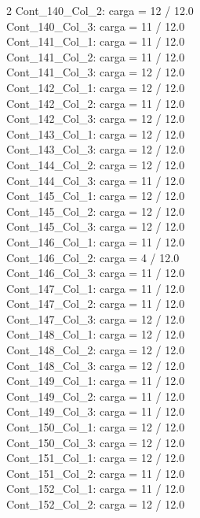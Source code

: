 \begin{multicols}{2}
Cont\_140\_Col\_2: carga = 12 / 12.0\\
Cont\_140\_Col\_3: carga = 11 / 12.0\\
Cont\_141\_Col\_1: carga = 11 / 12.0\\
Cont\_141\_Col\_2: carga = 11 / 12.0\\
Cont\_141\_Col\_3: carga = 12 / 12.0\\
Cont\_142\_Col\_1: carga = 12 / 12.0\\
Cont\_142\_Col\_2: carga = 11 / 12.0\\
Cont\_142\_Col\_3: carga = 12 / 12.0\\
Cont\_143\_Col\_1: carga = 12 / 12.0\\
Cont\_143\_Col\_3: carga = 12 / 12.0\\
Cont\_144\_Col\_2: carga = 12 / 12.0\\
Cont\_144\_Col\_3: carga = 11 / 12.0\\
Cont\_145\_Col\_1: carga = 12 / 12.0\\
Cont\_145\_Col\_2: carga = 12 / 12.0\\
Cont\_145\_Col\_3: carga = 12 / 12.0\\
Cont\_146\_Col\_1: carga = 11 / 12.0\\
Cont\_146\_Col\_2: carga = 4 / 12.0\\
Cont\_146\_Col\_3: carga = 11 / 12.0\\
Cont\_147\_Col\_1: carga = 11 / 12.0\\
Cont\_147\_Col\_2: carga = 11 / 12.0\\
Cont\_147\_Col\_3: carga = 12 / 12.0\\
Cont\_148\_Col\_1: carga = 12 / 12.0\\
Cont\_148\_Col\_2: carga = 12 / 12.0\\
Cont\_148\_Col\_3: carga = 12 / 12.0\\
Cont\_149\_Col\_1: carga = 11 / 12.0\\
Cont\_149\_Col\_2: carga = 11 / 12.0\\
Cont\_149\_Col\_3: carga = 11 / 12.0\\
Cont\_150\_Col\_1: carga = 12 / 12.0\\
Cont\_150\_Col\_3: carga = 12 / 12.0\\
Cont\_151\_Col\_1: carga = 12 / 12.0\\
Cont\_151\_Col\_2: carga = 11 / 12.0\\
Cont\_152\_Col\_1: carga = 11 / 12.0\\
Cont\_152\_Col\_2: carga = 12 / 12.0\\

\end{multicols}
